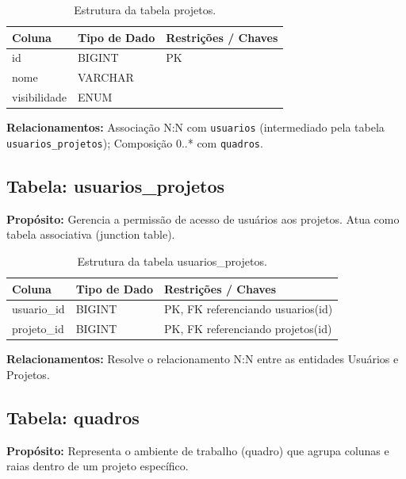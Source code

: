 \begin{table}[H]
    \centering
    \begin{tabular}{|l|l|p{8cm}|}
        \hline
        \textbf{Coluna} & \textbf{Tipo de Dado} & \textbf{Restrições / Chaves} \\
        \hline
        id & BIGINT & PK \\
        \hline
        nome & VARCHAR & \\
        \hline
        visibilidade & ENUM & \\
        \hline
    \end{tabular}
    \caption{Estrutura da tabela projetos.}
\end{table}
\noindent \textbf{Relacionamentos:} Associação N:N com \texttt{usuarios} (intermediado pela tabela \texttt{usuarios\_projetos}); Composição 0..* com \texttt{quadros}.

\subsection{Tabela: usuarios\_projetos}
\textbf{Propósito:} Gerencia a permissão de acesso de usuários aos projetos. Atua como tabela associativa (junction table).

\begin{table}[H]
    \centering
    \begin{tabular}{|l|l|p{8cm}|}
        \hline
        \textbf{Coluna} & \textbf{Tipo de Dado} & \textbf{Restrições / Chaves} \\
        \hline
        usuario\_id & BIGINT & PK, FK referenciando usuarios(id) \\
        \hline
        projeto\_id & BIGINT & PK, FK referenciando projetos(id) \\
        \hline
    \end{tabular}
    \caption{Estrutura da tabela usuarios\_projetos.}
\end{table}
\noindent \textbf{Relacionamentos:} Resolve o relacionamento N:N entre as entidades Usuários e Projetos.

\subsection{Tabela: quadros}
\textbf{Propósito:} Representa o ambiente de trabalho (quadro) que agrupa colunas e raias dentro de um projeto específico.

